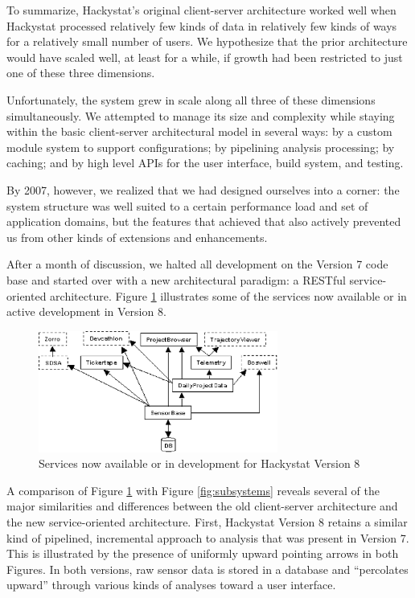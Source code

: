 \documentclass[conference,compsoc]{IEEEtran}
\begin{document}
To summarize, Hackystat's original client-server architecture worked well
when Hackystat processed relatively few kinds of data in relatively few
kinds of ways for a relatively small number of users.  We hypothesize that
the prior architecture would have scaled well, at least for a while, if
growth had been restricted to just one of these three dimensions.

Unfortunately, the system grew in scale along all three of these dimensions
simultaneously.  We attempted to manage its size and complexity while
staying within the basic client-server architectural model in several ways:
by a custom module system to support configurations; by pipelining analysis
processing; by caching; and by high level APIs for the user interface,
build system, and testing.

By 2007, however, we realized that we had designed ourselves into a
corner: the system structure was well suited to a certain performance
load and set of application domains, but the features that achieved that
also actively prevented us from other kinds of extensions and enhancements.

After a month of discussion, we halted all development on the Version 7
code base and started over with a new architectural paradigm: a RESTful
service-oriented architecture.  Figure \ref{fig:soa} illustrates some of 
the services now available or in active development in Version 8.

\begin{figure}[ht]
  \center
  \includegraphics[width=0.7\textwidth]{soa.eps}
  \caption{Services now available or in development for Hackystat Version 8}
  \label{fig:soa}
\end{figure} 

A comparison of Figure \ref{fig:soa} with Figure \ref{fig:subsystems}
reveals several of the major similarities and differences between the old
client-server architecture and the new service-oriented architecture.
First, Hackystat Version 8 retains a similar kind of pipelined, incremental
approach to analysis that was present in Version 7. This is illustrated by
the presence of uniformly upward pointing arrows in both Figures.  In both
versions, raw sensor data is stored in a database and ``percolates upward''
through various kinds of analyses toward a user interface.
\end{document}
